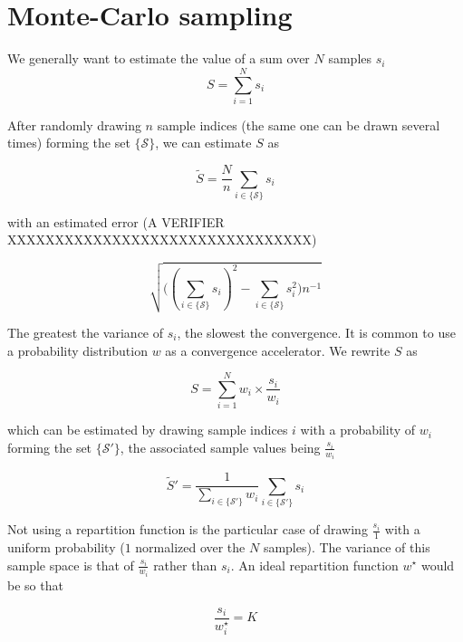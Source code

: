\documentclass[./thesis.tex]{subfiles}
\begin{document}
\section{Monte-Carlo sampling}

We generally want to estimate the value of a sum over $N$ samples $s_i$
\begin{equation}
S = \sum_{i=1}^N {s_i}
\end{equation}

After randomly drawing $n$ sample indices (the same one can be drawn several times) forming the set $\{\mathcal{S}\}$, we can estimate $S$ as

\begin{equation}
\tilde S = \frac{N}{n} \sum_{i \in \{\mathcal{S}\}} {s_i}
\end{equation}

with an estimated error (A VERIFIER XXXXXXXXXXXXXXXXXXXXXXXXXXXXXXXX)

\begin{equation}
\sqrt{ \Big ((\sum_{i \in \{\mathcal{S}\}} {s_i})^2 - \sum_{i \in \{\mathcal{S}\}} {s^2_i} \Big )n^{-1} }
\end{equation}

The greatest the variance of $s_i$, the slowest the convergence. It is common to use a probability distribution $w$ as a convergence accelerator. We rewrite $S$ as 

\begin{equation}
S = \sum_{i=1}^N {w_i \times \frac{s_i}{w_i}}
\end{equation}

which can be estimated by drawing sample indices $i$ with a probability of $w_i$ forming the set $\{\mathcal{S'}\}$, the associated sample values being $\frac{s_i}{w_i}$

\begin{equation}
\tilde S' = \frac{1} {\sum_{i \in \{ \mathcal{S'} \} } w_i} \sum_{i \in \{\mathcal{S'}\}} {s_i}
\end{equation}

Not using a repartition function is the particular case of drawing $\frac{s_i}{1}$ with a uniform probability ($1$ normalized over the $N$ samples). The variance of this sample space is that of $\frac{s_i}{w_i}$ rather than $s_i$. An ideal repartition function $w^\star$ would be so that

\begin{equation}
\frac{s_i}{w^\star_i} = K
\end{equation}
\end{document}
